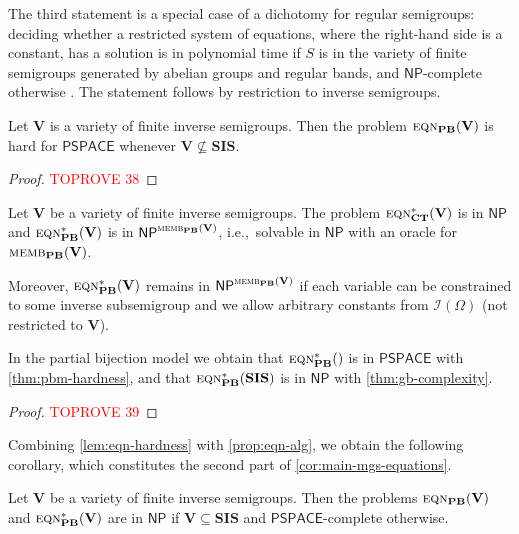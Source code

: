 \documentclass[anonymous,letter,UKenglish,cleveref,autoref,thm-restate]{lipics-v2021}
\newcommand{\ie}{i.e.,~}
\newcommand{\sse}{\subseteq}
\newcommand{\NP}{\ensuremath{\mathsf{NP}}\xspace}
\newcommand{\PSPACE}{\ensuremath{\mathsf{PSPACE}}\xspace}
\newcommand{\vV}{\ensuremath{\mathbf{V}}}
\newcommand{\vSI}{\ensuremath{\mathbf{SIS}}}
\newcommand{\ISym}{\cI}
\newcommand{\cI}{\mathcal{I}}
\theoremstyle{plain}
\theoremstyle{plain}
\newcommand{\dMemb}[2][]{\textup{\textsc{memb${}_{\mathbf{#1}}\expandafter\ifx\expandafter\relax\detokenize{#2}\relax\else(#2)\fi$}}}
\newcommand{\dEqn}[2][]{\textup{\textsc{eqn${}_{\mathbf{#1}}\expandafter\ifx\expandafter\relax\detokenize{#2}\relax\else(#2)\fi$}}}
\newcommand{\dEqnSys}[2][]{\textup{\textsc{eqn${}^\ast_{\mathbf{#1}}\expandafter\ifx\expandafter\relax\detokenize{#2}\relax\else(#2)\fi$}}}
\begin{document}
The third statement is a special case of a dichotomy for regular semigroups: deciding whether a restricted system of equations, where the right-hand side is a constant, has a solution is in polynomial time if $S$ is in the variety of finite semigroups generated by abelian groups and regular bands, and $\NP$-complete otherwise \cite{KlimaTT07}.
The statement follows by restriction to inverse semigroups.

\begin{lemma}\label{lem:eqn-hardness}
  Let $\vV$ is a variety of finite inverse semigroups.
  Then the problem $\dEqn[PB]{\vV}$ is hard for $\PSPACE$ whenever $\vV \not\subseteq \vSI$.
\end{lemma}

\begin{proof}\textcolor{red}{TOPROVE 38}\end{proof} 

\begin{observation}\label{prop:eqn-alg}
  Let $\vV$ be a variety of finite inverse semigroups.
	The problem $\dEqnSys[CT]{\vV}$ is in $\NP$ and $\dEqnSys[PB]{\vV}$ is in $\NP^{\dMemb[PB]{\vV}}$, \ie solvable in $\NP$ with an oracle for $\dMemb[PB]{\vV}$.

  \smallskip
	
	Moreover, $\dEqnSys[PB]{\vV}$ remains in $\NP^{\dMemb[PB]{\vV}}$ if each variable can be constrained to some inverse subsemigroup and we allow arbitrary constants from $\ISym(\Omega)$ (not restricted to $\vV$).
\end{observation}

In the partial bijection model we obtain that $\dEqnSys[PB]{}$ is in $\PSPACE$ with \cref{thm:pbm-hardness}, and that $\dEqnSys[PB]{\vSI}$ is in $\NP$ with \cref{thm:gb-complexity}.

\begin{proof}\textcolor{red}{TOPROVE 39}\end{proof}

Combining \cref{lem:eqn-hardness} with \cref{prop:eqn-alg}, we obtain the following corollary, which constitutes the second part of \cref{cor:main-mgs-equations}.

 \begin{corollary}\label{cor:equations}
 	Let $\vV$ be a variety of finite inverse semigroups.
 	Then the problems $\dEqn[PB]{\vV}$ and $\dEqnSys[PB]{\vV}$ are in \NP if $\vV\sse \vSI$ and \PSPACE-complete otherwise.
 \end{corollary}
\end{document}
